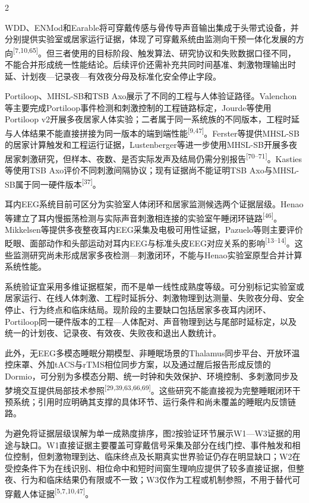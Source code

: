 \documentclass[UTF8,zihao=5,fontset=none]{ctexart}
\newcommand{\refcite}[1]{\nolinebreak[4]\textsuperscript{[#1]}}
\begin{document}
\begin{multicols}{2}

WDD、ENMod和Earable将可穿戴传感与骨传导声音输出集成于头带式设备，并分别提供实验室或居家运行证据，体现了可穿戴系统由监测向干预一体化发展的方向\refcite{7,10,65}。但三者使用的目标阶段、触发算法、研究协议和失败数据口径不同，不能合并形成统一性能结论。后续评价还需补充共同时间基准、刺激物理输出时延、计划夜—记录夜—有效夜分母及标准化安全停止字段。\par

Portiloop、MHSL-SB和TSB Axo展示了不同的工程与人体验证路径。Valenchon等主要完成Portiloop事件检测和刺激控制的工程链路标定，Jourde等使用Portiloop v2开展多夜居家人体实验；二者属于同一系统族的不同版本，工程时延与人体结果不能直接拼接为同一版本的端到端性能\refcite{9,47}。Ferster等提供MHSL-SB的居家计算触发和工程运行证据，Lustenberger等进一步使用MHSL-SB开展多夜居家刺激研究，但样本、夜数、是否实际发声及结局仍需分别报告\refcite{70--71}。Kasties等使用TSB Axo评价不同刺激间隔协议；现有证据尚不能证明TSB Axo与MHSL-SB属于同一硬件版本\refcite{37}。\par

耳内EEG系统目前可区分为实验室人体闭环和居家监测候选两个证据层级。Henao等建立了耳内慢振荡检测与实际声音刺激相连接的实验室午睡闭环链路\refcite{46}。Mikkelsen等提供多夜整夜耳内EEG采集及电极可用性证据，Pazuelo等则主要评价眨眼、面部动作和头部运动对耳内EEG与标准头皮EEG对应关系的影响\refcite{13--14}。这些监测研究尚未形成居家多夜检测—刺激闭环，不能与Henao实验室原型合并计算系统性能。\par

系统验证宜采用多维证据框架，而不是单一线性成熟度等级。可分别标记实验室或居家运行、在线人体刺激、工程时延拆分、刺激物理到达测量、失败夜分母、安全停止、行为终点和临床结局。现阶段的主要缺口包括居家多夜耳内闭环、Portiloop同一硬件版本的工程—人体配对、声音物理到达与尾部时延标定，以及统一的计划夜、记录夜、有效夜、失败夜和退出人数统计。\par

此外，无EEG多模态睡眠分期模型、非睡眠场景的Thalamus同步平台、开放环温控床罩、外加tACS与rTMS相位同步方案，以及通过醒后报告形成反馈的Dormio，可分别为多模态分期、统一时钟和失效保护、环境控制、多刺激同步及梦境交互提供局部技术参照\refcite{29,39,63,66,69}。这些研究不能直接视为完整睡眠闭环干预系统；引用时应明确其支撑的具体环节、运行条件和尚未覆盖的睡眠内反馈链路。\par

为避免将证据层级误解为单一成熟度排序，图2按验证环节展示W1—W3证据的用途与缺口。W1直接证据主要覆盖可穿戴信号采集及部分在线门控、事件触发和相位控制，但刺激物理到达、临床终点及长期真实世界验证仍存在明显缺口；W2在受控条件下为在线识别、相位命中和短时间窗生理响应提供了较多直接证据，但整夜、行为和临床结果仍有限或不一致；W3仅作为工程或机制参照，不用于替代可穿戴人体证据\refcite{5,7,10,47}。\par

\end{multicols}
\end{document}
